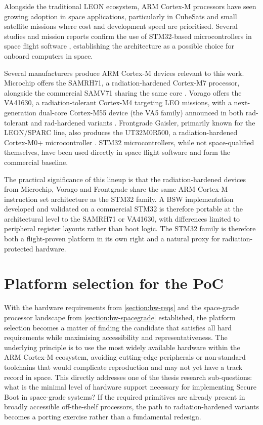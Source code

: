 Alongside the traditional LEON ecosystem, ARM Cortex-M processors have seen growing adoption in space applications, particularly in CubeSats and small satellite missions where cost and development speed are prioritised. Several studies and mission reports confirm the use of STM32-based microcontrollers in space flight software \cite{space_odyssey_2023, cubesat_fsw_design, cubesat_fsw_development, cubesat_flight_software}, establishing the architecture as a possible choice for onboard computers in space.

Several manufacturers produce ARM Cortex-M devices relevant to this work. Microchip offers the SAMRH71, a radiation-hardened Cortex-M7 processor, alongside the commercial SAMV71 sharing the same core \cite{microchip_rad_tolerant}. Vorago offers the VA41630, a radiation-tolerant Cortex-M4 targeting LEO missions, with a next-generation dual-core Cortex-M55 device (the VA5 family) announced in both rad-tolerant and rad-hardened variants \cite{vorago_va4_satellites}. Frontgrade Gaisler, primarily known for the LEON/SPARC line, also produces the UT32M0R500, a radiation-hardened Cortex-M0+ microcontroller \cite{frontgrade_arm_microcontrollers}. STM32 microcontrollers, while not space-qualified themselves, have been used directly in space flight software \cite{space_odyssey_2023, cubesat_fsw_design, cubesat_fsw_development, cubesat_flight_software} and form the commercial baseline.

The practical significance of this lineup is that the radiation-hardened devices from Microchip, Vorago and Frontgrade share the same ARM Cortex-M instruction set architecture as the STM32 family. A BSW implementation developed and validated on a commercial STM32 is therefore portable at the architectural level to the SAMRH71 or VA41630, with differences limited to peripheral register layouts rather than boot logic. The STM32 family is therefore both a flight-proven platform in its own right and a natural proxy for radiation-protected hardware.


\section{Platform selection for the PoC}
\label{section:hw-selection}

With the hardware requirements from \autoref{section:hw-reqs} and the space-grade processor landscape from \autoref{section:hw-spacegrade} established, the platform selection becomes a matter of finding the candidate that satisfies all hard requirements while maximising accessibility and representativeness. The underlying principle is to use the most widely available hardware within the ARM Cortex-M ecosystem, avoiding cutting-edge peripherals or non-standard toolchains that would complicate reproduction and may not yet have a track record in space. This directly addresses one of the thesis research sub-questions: what is the minimal level of hardware support necessary for implementing Secure Boot in space-grade systems? If the required primitives are already present in broadly accessible off-the-shelf processors, the path to radiation-hardened variants becomes a porting exercise rather than a fundamental redesign.


